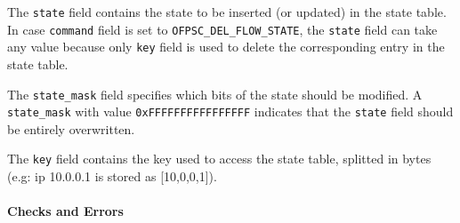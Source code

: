 The \texttt{state} field contains the state to be inserted (or updated) in the state table. In case \texttt{command} field is set to \texttt{OFPSC\_DEL\_FLOW\_STATE}, the \texttt{state} field can take any value because only \texttt{key} field is used to delete the corresponding entry in the state table.

The \texttt{state\_mask} field specifies which bits of the state should be modified. A \texttt{state\_mask} with value \texttt{0xFFFFFFFFFFFFFFFF} indicates that the \texttt{state} field should be entirely overwritten.

The \texttt{key} field contains the key used to access the state table, splitted in bytes (e.g: ip 10.0.0.1 is stored as [10,0,0,1]).

\paragraph{Checks and Errors}

